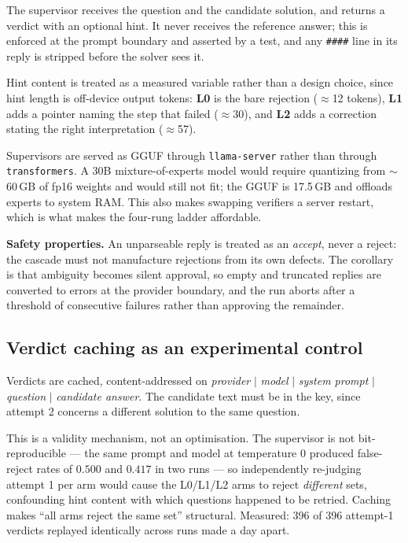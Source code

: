 \documentclass[conference]{IEEEtran}
\begin{document}
The supervisor receives the question and the candidate solution, and returns a verdict
with an optional hint. It never receives the reference answer; this is enforced at the
prompt boundary and asserted by a test, and any \verb|####| line in its reply is stripped
before the solver sees it.

Hint content is treated as a measured variable rather than a design choice, since hint
length is off-device output tokens: \textbf{L0} is the bare rejection ($\approx$12
tokens), \textbf{L1} adds a pointer naming the step that failed ($\approx$30), and
\textbf{L2} adds a correction stating the right interpretation ($\approx$57).

Supervisors are served as GGUF through \texttt{llama-server} rather than through
\texttt{transformers}. A 30B mixture-of-experts model would require quantizing from
$\sim$60\,GB of fp16 weights and would still not fit; the GGUF is 17.5\,GB and offloads
experts to system RAM. This also makes swapping verifiers a server restart, which is what
makes the four-rung ladder affordable.

\textbf{Safety properties.} An unparseable reply is treated as an \emph{accept}, never a
reject: the cascade must not manufacture rejections from its own defects. The corollary is
that ambiguity becomes silent approval, so empty and truncated replies are converted to
errors at the provider boundary, and the run aborts after a threshold of consecutive
failures rather than approving the remainder.

\subsection{Verdict caching as an experimental control}
\label{sec:cache}

Verdicts are cached, content-addressed on \textit{provider} $|$ \textit{model} $|$
\textit{system prompt} $|$ \textit{question} $|$ \textit{candidate answer}. The candidate
text must be in the key, since attempt 2 concerns a different solution to the same
question.

This is a validity mechanism, not an optimisation. The supervisor is not bit-reproducible
--- the same prompt and model at temperature 0 produced false-reject rates of $0.500$ and
$0.417$ in two runs --- so independently re-judging attempt 1 per arm would cause the
L0/L1/L2 arms to reject \emph{different} sets, confounding hint content with which
questions happened to be retried. Caching makes ``all arms reject the same set''
structural. Measured: 396 of 396 attempt-1 verdicts replayed identically across runs made
a day apart.
\end{document}
